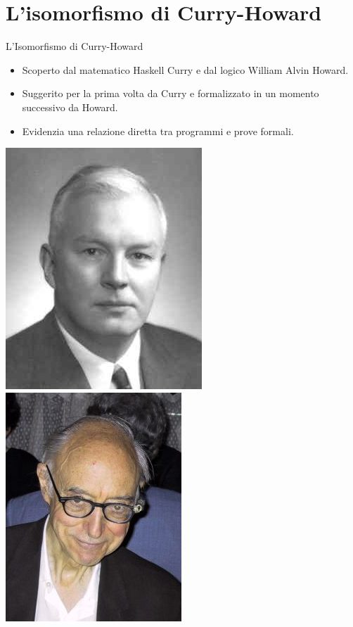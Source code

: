 \documentclass{beamer}
\begin{document}
\section{L'isomorfismo di Curry-Howard}
\begin{frame}{L'Isomorfismo di Curry-Howard}
\begin{itemize}
  \item Scoperto dal matematico Haskell Curry e dal logico William Alvin Howard.
  \item Suggerito per la prima volta da Curry e formalizzato in un momento successivo
    da Howard.
  \item Evidenzia una relazione diretta tra programmi e prove formali.
\end{itemize}

\begin{center}
\includegraphics[scale=0.455]{1.jpg}
\includegraphics[scale=2]{2.jpg}
\end{center}
\end{frame}
\end{document}
